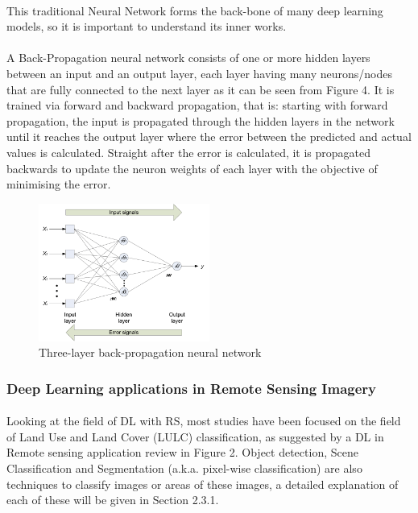 \documentclass{article}
\begin{document}
\paragraph{}
This traditional Neural Network forms the back-bone of many deep learning models, so it is important to understand its inner works.

\paragraph{}

A Back-Propagation neural network consists of one or more hidden layers between an input and an output layer, each layer having many neurons/nodes that are fully connected to the next layer as it can be seen from Figure 4.  It is trained via forward and backward propagation, that is: starting with forward propagation, the input is propagated through the hidden layers in the network until it reaches the output layer where the error between the predicted and actual values is calculated. Straight after the error is calculated, it is propagated backwards to update the neuron weights of each layer with the objective of minimising the error.

    \begin{figure}[hbt!]
        \centering
        \includegraphics[width=0.5\textwidth]{Three-layer-back-propagation-neural-network.png}
        \caption{Three-layer back-propagation neural network \cite{NNpic}}
    \end{figure}

\subsubsection{Deep Learning applications in Remote Sensing Imagery}

\paragraph{}
Looking at the field of DL with RS, most studies have been focused on the field of Land Use and Land Cover (LULC) classification, as suggested by a DL in Remote sensing application review \cite{MA2019166} in Figure 2. Object detection, Scene Classification and Segmentation (a.k.a. pixel-wise classification) are also techniques to classify images or areas of these images, a detailed explanation of each of these will be given in Section 2.3.1.
\end{document}
